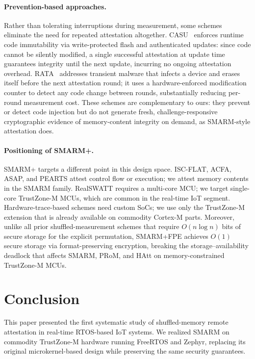 \documentclass{ieeeaccess}
\newcommand{\rtsmarm}{SMARM+\xspace}
\newcommand{\rtsmarmtwo}{SMARM+FPE\xspace}
\begin{document}
{\paragraph{Prevention-based approaches.}
Rather than tolerating interruptions during measurement,
some schemes eliminate the need for repeated attestation
altogether. CASU~\cite{casu} enforces runtime code
immutability via write-protected flash and authenticated
updates: since code cannot be silently modified, a single
successful attestation at update time guarantees integrity
until the next update, incurring no ongoing attestation
overhead. RATA~\cite{rata} addresses transient malware
that infects a device and erases itself before the next
attestation round; it uses a hardware-enforced modification
counter to detect any code change between rounds, substantially
reducing per-round measurement cost. These schemes are
complementary to ours: they prevent or detect code injection
but do not generate fresh, challenge-responsive
cryptographic evidence of memory-content integrity on demand,
as SMARM-style attestation does.

\paragraph{Positioning of \rtsmarm.}
\rtsmarm targets a different point in this design space.
ISC-FLAT, ACFA, ASAP, and PEARTS attest control flow or
execution; we attest memory contents in the SMARM family.
RealSWATT requires a multi-core MCU; we target single-core
TrustZone-M MCUs, which are common in the real-time IoT
segment. Hardware-trace-based schemes need custom SoCs;
we use only the TrustZone-M extension that is already
available on commodity Cortex-M parts. Moreover, unlike all prior shuffled-measurement schemes that require $O(n \log n)$ bits of secure storage for the explicit permutation, \rtsmarmtwo achieves $O(1)$ secure
storage via format-preserving encryption, breaking the
storage--availability deadlock that affects SMARM, PRoM,
and HAtt on memory-constrained TrustZone-M MCUs.
}


\section{Conclusion}
\label{sec:conclusion}

This paper presented the first systematic study of shuffled-memory remote attestation in real-time RTOS-based IoT systems. We realized SMARM on commodity TrustZone-M hardware running FreeRTOS and Zephyr, replacing its original microkernel-based design while preserving the same security guarantees.
\end{document}
